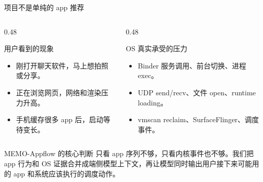 \documentclass[UTF8,aspectratio=169,10pt]{ctexbeamer}
\begin{document}
\begin{frame}{项目不是单纯的 app 推荐}
  \begin{columns}[T,totalwidth=\textwidth]
    \begin{column}{0.48\textwidth}
      \begin{block}{用户看到的现象}
        \begin{itemize}
          \item 刚打开聊天软件，马上想拍照或分享。
          \item 正在浏览网页，网络和渲染压力升高。
          \item 手机缓存很多 app 后，启动等待变长。
        \end{itemize}
      \end{block}
    \end{column}
    \begin{column}{0.48\textwidth}
      \begin{block}{OS 真实承受的压力}
        \begin{itemize}
          \item Binder 服务调用、前台切换、进程 exec。
          \item UDP send/recv、文件 open、runtime loading。
          \item vmscan reclaim、SurfaceFlinger、调度事件。
        \end{itemize}
      \end{block}
    \end{column}
  \end{columns}
  \vspace{0.8em}
  \begin{alertblock}{MEMO-Appflow 的核心判断}
    只看 app 序列不够，只看内核事件也不够。我们把 app 行为和 OS 证据合并成端侧模型上下文，再让模型同时输出用户接下来可能用的 app 和系统应该执行的调度动作。
  \end{alertblock}
\end{frame}
\end{document}
